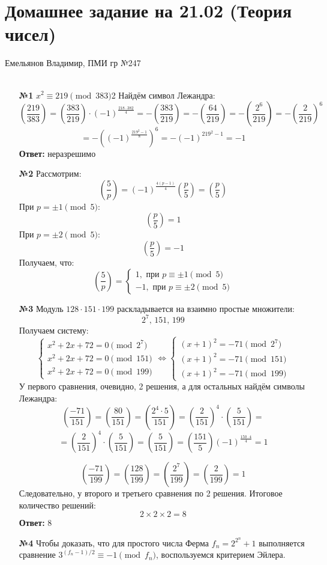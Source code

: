 \documentclass[a4paper]{article}
\renewcommand{\f}[2]{\frac{#1}{#2}}
\newcommand{\case}[1]{\begin{cases} #1 \end{cases}}
\newcommand{\lr}{\Leftrightarrow}
\newcommand{\leg}[2]{\left(\f{#1}{#2}\right)}
\begin{document}
\section*{Домашнее задание на 21.02 (Теория чисел)}
 {\large Емельянов Владимир, ПМИ гр №247}\\\\
\begin{enumerate}
    \item[\textbf{№1}]$x^2 \equiv 219 \pmod{383}$2
    Найдём символ Лежандра:
    $$\leg{219}{383} = \leg{383}{219} \cdot (-1)^{\f{218\cdot 382}{4}} = -\leg{383}{219} =- \leg{64}{219} = -\leg{2^6}{219} = -\leg{2}{219}^6 $$
    $$=-\left((-1)^{\f{219^2-1}{8}}\right)^6 = -(-1)^{219^2-1} = -1$$
    \textbf{Ответ: } неразрешимо

    \item[\textbf{№2}]Рассмотрим:
    $$\leg{5}{p} = (-1)^{\f{4(p-1)}{4}}\leg{p}{5} = \leg{p}{5}$$
    При $p = \pm 1 \pmod{5}$:
    $$\leg{p}{5} = 1$$
    При $p = \pm 2 \pmod{5}$:
    $$\leg{p}{5} = -1$$
    Получаем, что:
    $$\leg{5}{p} = \case{
        1 , \text{ при } p \equiv \pm 1 \pmod{5}\\
        -1, \text{ при } p \equiv \pm 2 \pmod{5}
    }$$

    \item[\textbf{№3}]Модуль \(128 \cdot 151 \cdot 199\) раскладывается на взаимно
     простые множители: 
     $$\text{\(2^7\), \(151\), \(199\)}$$ 
     Получаем систему:
     $$\case{
        x^2+2x+72=0 \pmod{2^7}\\
        x^2+2x+72=0 \pmod{151}\\
        x^2+2x+72=0 \pmod{199}
     }\lr \case{
        (x+1)^2=-71 \pmod{2^7}\\
        (x+1)^2=-71 \pmod{151}\\
        (x+1)^2=-71 \pmod{199}
     }
     $$
    У первого сравнения, очевидно, 2 решения, а для остальных найдём символы Лежандра:
    $$\leg{-71}{151}=\leg{80}{151}=\leg{2^4\cdot 5}{151} = \leg{2}{151}^4\cdot \leg{5}{151} = $$
    $$=\leg{2}{151}^4\cdot \leg{5}{151} = \leg{5}{151} = \leg{151}{5}(-1)^{\f{150\cdot 4}{4}} = 1$$
    
    $$\leg{-71}{199} = \leg{128}{199} = \leg{2^7}{199} = \leg{2}{199} = 1$$
    Следовательно, у второго и третьего сравнения по 2 решения. Итоговое количество решений:
    $$2 \times 2 \times 2 = 8$$
    \textbf{Ответ: } $8$

    \item[\textbf{№4}]Чтобы доказать, что для простого числа Ферма 
    \( f_n = 2^{2^n} + 1 \) выполняется сравнение 
    \( 3^{(f_n-1)/2} \equiv -1 \pmod{f_n} \),
     воспользуемся критерием Эйлера.
        

\end{enumerate}
\end{document}
